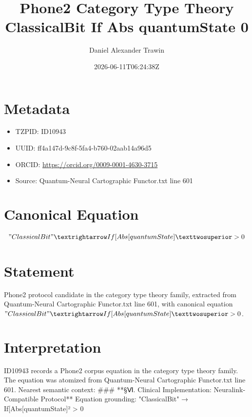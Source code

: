 \documentclass[11pt]{article}
\title{Phone2 Category Type Theory ClassicalBit If Abs quantumState 0}
\author{Daniel Alexander Trawin}
\date{2026-06-11T06:24:38Z}
\begin{document}
\maketitle
\section*{Metadata}
\begin{itemize}
\item TZPID: ID10943
\item UUID: ff4a147d-9c8f-5fa4-b760-02aab14a96d5
\item ORCID: \url{https://orcid.org/0009-0001-4630-3715}
\item Source: Quantum-Neural Cartographic Functor.txt line 601
\end{itemize}
\section*{Canonical Equation}
\[
"ClassicalBit" → If[Abs[quantumState]² > 0
\]
\section*{Statement}
Phone2 protocol candidate in the category type theory family, extracted from Quantum-Neural Cartographic Functor.txt line 601, with canonical equation $"ClassicalBit" → If[Abs[quantumState]² > 0$.
\section*{Interpretation}
ID10943 records a Phone2 corpus equation in the category type theory family. The equation was atomized from Quantum-Neural Cartographic Functor.txt line 601. Nearest semantic context: ### **§Ⅵ. Clinical Implementation: Neuralink-Compatible Protocol** Equation grounding: "ClassicalBit" → If[Abs[quantumState]² > 0
\end{document}
